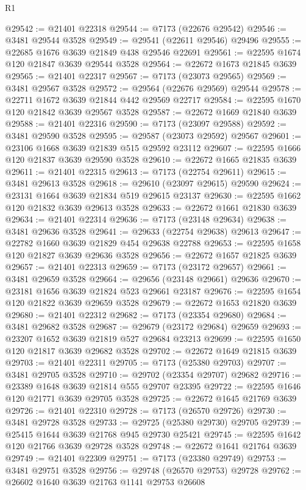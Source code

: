 \begin{lexlean}{R1}
\begin{coremodule}
@29542 := @21401 @22318
@29544 := @7173 (@22676 @29542)
@29546 := @3481 @29544 @3528
@29549 := @29541 (@22611 @29546) @29496
@29555 := @22685 @1676 @3639 @21849 @438 @29546 @22691
@29561 := @22595 @1674 @120 @21847 @3639 @29544 @3528
@29564 := @22672 @1673 @21845 @3639
@29565 := @21401 @22317
@29567 := @7173 (@23073 @29565)
@29569 := @3481 @29567 @3528
@29572 := @29564 (@22676 @29569) @29544
@29578 := @22711 @1672 @3639 @21844 @442 @29569 @22717
@29584 := @22595 @1670 @120 @21842 @3639 @29567 @3528
@29587 := @22672 @1669 @21840 @3639
@29588 := @21401 @22316
@29590 := @7173 (@23097 @29588)
@29592 := @3481 @29590 @3528
@29595 := @29587 (@23073 @29592) @29567
@29601 := @23106 @1668 @3639 @21839 @515 @29592 @23112
@29607 := @22595 @1666 @120 @21837 @3639 @29590 @3528
@29610 := @22672 @1665 @21835 @3639
@29611 := @21401 @22315
@29613 := @7173 (@22754 @29611)
@29615 := @3481 @29613 @3528
@29618 := @29610 (@23097 @29615) @29590
@29624 := @23131 @1664 @3639 @21834 @519 @29615 @23137
@29630 := @22595 @1662 @120 @21832 @3639 @29613 @3528
@29633 := @22672 @1661 @21830 @3639
@29634 := @21401 @22314
@29636 := @7173 (@23148 @29634)
@29638 := @3481 @29636 @3528
@29641 := @29633 (@22754 @29638) @29613
@29647 := @22782 @1660 @3639 @21829 @454 @29638 @22788
@29653 := @22595 @1658 @120 @21827 @3639 @29636 @3528
@29656 := @22672 @1657 @21825 @3639
@29657 := @21401 @22313
@29659 := @7173 (@23172 @29657)
@29661 := @3481 @29659 @3528
@29664 := @29656 (@23148 @29661) @29636
@29670 := @23181 @1656 @3639 @21824 @523 @29661 @23187
@29676 := @22595 @1654 @120 @21822 @3639 @29659 @3528
@29679 := @22672 @1653 @21820 @3639
@29680 := @21401 @22312
@29682 := @7173 (@23354 @29680)
@29684 := @3481 @29682 @3528
@29687 := @29679 (@23172 @29684) @29659
@29693 := @23207 @1652 @3639 @21819 @527 @29684 @23213
@29699 := @22595 @1650 @120 @21817 @3639 @29682 @3528
@29702 := @22672 @1649 @21815 @3639
@29703 := @21401 @22311
@29705 := @7173 (@25380 @29703)
@29707 := @3481 @29705 @3528
@29710 := @29702 (@23354 @29707) @29682
@29716 := @23389 @1648 @3639 @21814 @555 @29707 @23395
@29722 := @22595 @1646 @120 @21771 @3639 @29705 @3528
@29725 := @22672 @1645 @21769 @3639
@29726 := @21401 @22310
@29728 := @7173 (@26570 @29726)
@29730 := @3481 @29728 @3528
@29733 := @29725 (@25380 @29730) @29705
@29739 := @25415 @1644 @3639 @21768 @945 @29730 @25421
@29745 := @22595 @1642 @120 @21766 @3639 @29728 @3528
@29748 := @22672 @1641 @21764 @3639
@29749 := @21401 @22309
@29751 := @7173 (@23380 @29749)
@29753 := @3481 @29751 @3528
@29756 := @29748 (@26570 @29753) @29728
@29762 := @26602 @1640 @3639 @21763 @1141 @29753 @26608

\end{coremodule}
\end{lexlean}
